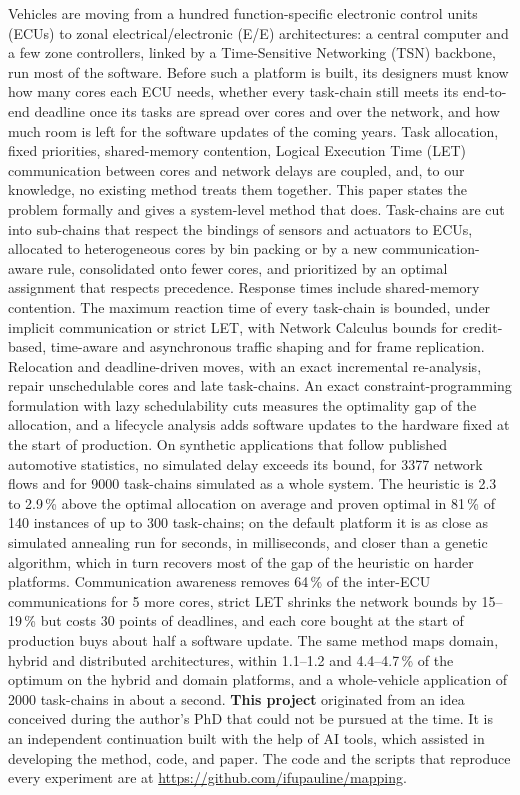 \hspace{0.4em}%
Vehicles are moving from a hundred function-specific electronic control
units (ECUs) to zonal electrical/electronic (E/E) architectures: a central
computer and a few zone controllers, linked by a Time-Sensitive Networking
(TSN) backbone, run most of the software. Before such a platform is built,
its designers must know how many cores each ECU needs, whether every
task-chain still meets its end-to-end deadline once its tasks are spread
over cores and over the network, and how much room is left for the
software updates of the coming years. Task allocation, fixed priorities,
shared-memory contention, Logical Execution Time (LET) communication
between cores and network delays are coupled, and, to our knowledge, no
existing method treats them together. This paper states the problem
formally and gives a system-level method that does. Task-chains are cut into sub-chains that
respect the bindings of sensors and actuators to ECUs, allocated to
heterogeneous cores by bin packing or by a new communication-aware rule,
consolidated onto fewer cores, and prioritized by an optimal assignment
that respects precedence. Response times include shared-memory
contention. The maximum reaction time of every task-chain is bounded,
under implicit communication or strict LET, with Network Calculus bounds for credit-based, time-aware and asynchronous
traffic shaping and for frame replication. Relocation and
deadline-driven moves, with an exact incremental re-analysis, repair
unschedulable cores and late task-chains. An exact constraint-programming
formulation with lazy schedulability cuts measures the optimality gap of the allocation,
and a lifecycle analysis adds software updates to the hardware fixed at
the start of production. On synthetic applications that follow published automotive
statistics, no simulated delay exceeds its bound, for 3377 network flows
and for 9000 task-chains simulated as a whole system. The heuristic is
2.3 to 2.9\,\% above the optimal allocation on average and proven optimal
in 81\,\% of 140 instances of up to 300 task-chains; on the default
platform it is as close as simulated annealing run for seconds, in
milliseconds, and closer than a genetic algorithm, which in turn
recovers most of the gap of the heuristic on harder platforms.
Communication awareness removes 64\,\% of the inter-ECU communications
for 5 more cores, strict LET shrinks the network bounds by 15--19\,\% but
costs 30 points of deadlines, and each core bought at the start of
production buys about half a software update. The same method maps domain, hybrid and
distributed architectures, within 1.1--1.2 and 4.4--4.7\,\% of the optimum on
the hybrid and domain platforms, and a whole-vehicle application of 2000
task-chains in about a second. \textbf{This project} originated from an idea conceived during the author's PhD
that could not be pursued at the time. It is an independent continuation
built with the help of AI tools, which assisted in developing the method,
code, and paper. The code and the scripts that reproduce every
experiment are at \url{https://github.com/ifupauline/mapping}.

